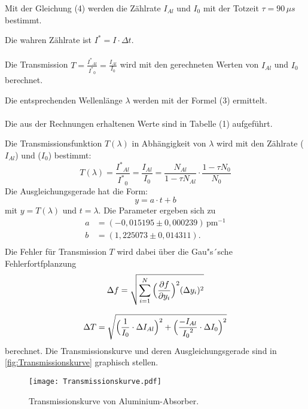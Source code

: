 Mit der Gleichung (4) werden die Zählrate $I_{Al}$ und $I_{0}$ mit der Totzeit \(\tau=90 \,\mu s \) bestimmt.

Die wahren Zählrate ist \(I^{*}=I \cdot \Delta t\).
\paragraph{}
Die Transmission \(T=\frac{{I^{*}}_{Al}}{{I^{*}}_{0}} =\frac{I_{Al}}{I_{0}}\) wird mit den gerechneten Werten von $I_{Al}$ und $I_{0}$ berechnet. 

Die entsprechenden Wellenlänge  $\lambda$ werden mit der Formel (3) ermittelt.
\paragraph{}
Die aus der Rechnungen erhaltenen Werte sind in Tabelle (1) aufgeführt.

Die Transmissionsfunktion $T(\lambda)$ in Abhängigkeit von $\lambda$ wird mit den Zählrate ($I_{Al}$) und ($I_{0}$) bestimmt:
\begin{equation}
  T(\lambda)=\frac{{I^{*}}_{Al}}{{I^{*}}_{0}} =\frac{I_{Al}}{I_{0}}={\frac{N_{Al}}{1-\tau N_{Al}}}\cdot {\frac{1-\tau N_{0}}{{ N_{0}}}}
\end{equation}
Die Ausgleichungsgerade hat die Form:
\begin{equation}
 y=a\cdot t+b 
\end{equation}
mit \(y=T(\lambda)\) und \(t= \lambda\).
Die Parameter ergeben sich zu
\begin{align*}
  a &=(-0,015195 \pm 0,000239)\,\mathrm{pm^{-1}}\\
  b &=(1,225073 \pm 0,014311).\\
 \end{align*}
 Die Fehler für Transmission $T$  wird dabei über die Gau"s´sche Fehlerfortfplanzung 
 \begin{equation}
     \Delta f = \sqrt{\sum_{i=1}^N {\Bigl(\frac{\partial f}{\partial y_i}\Bigr)^2 (\Delta y_i)^2}}
 \end{equation}

 \begin{align*}
  \Delta T =\sqrt{\Bigl(\frac{1}{I_{0}} \cdot \Delta {I}_{Al}\Bigr)^2+\Bigl(\frac{-{I}_{Al}}{{{I}_{0}}^2} \cdot \Delta {I}_{0}\Bigr)^2}
 \end{align*}
 berechnet.
Die Transmissionskurve und deren Ausgleichungsgerade sind in \autoref{fig:Transmissionskurve} graphisch stellen.


\begin{figure}
  \centering
  \texttt{[image: Transmissionskurve.pdf]}
  \caption{Transmissionskurve von Aluminium-Absorber.}
  \label{fig:Transmissionskurve}
\end{figure}


